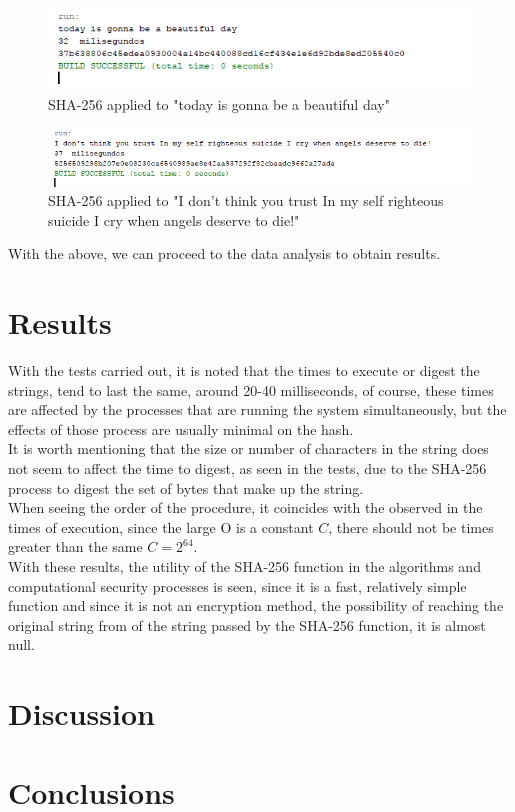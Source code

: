 \documentclass[journal]{IEEEtran}
\begin{document}
\begin{figure}[H] 
	\centering \includegraphics[width=.70\columnwidth]{Code_today.png}
	\caption{
		\label{fig:samplesetup}
		SHA-256 applied to "today is gonna be a beautiful day"
	}
\end{figure}
\begin{figure}[H] 
	\centering \includegraphics[width=.70\columnwidth]{Code_Long.png}
	\caption{
		\label{fig:samplesetup}
		SHA-256 applied to "I don't think you trust In my self righteous suicide I cry when angels deserve to die!"
	}
\end{figure}

With the above, we can proceed to the data analysis to obtain results.
\section{Results}
With the tests carried out, it is noted that the times to execute or digest the strings, tend to last the same, around 20-40 milliseconds,
of course, these times are affected by the processes that are running the system simultaneously, but the effects of those process are usually minimal on the hash.\\It is worth mentioning that the size or number of characters in the string does not seem to affect the time to digest, as seen in the tests, due to the SHA-256 process to digest the set of bytes that make up the string.\\When seeing the order of the procedure, it coincides with the observed in the times of execution, since the large O is a constant $C$, there should not be times greater than the same $C=2^{64}$.\\With these results, the utility of the SHA-256 function in the algorithms and computational security processes is seen, since it is a fast, relatively simple function and since it is not an encryption method, the possibility of reaching the original string from of the string passed by the SHA-256 function, it is almost null.
\section{Discussion}
\section{Conclusions}
\end{document}
